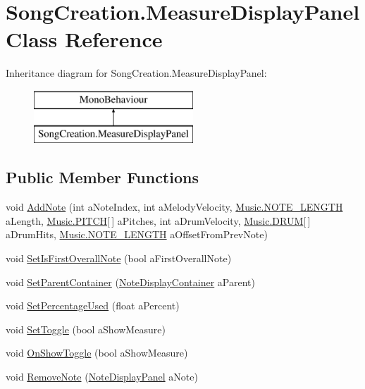 \hypertarget{class_song_creation_1_1_measure_display_panel}{}\section{Song\+Creation.\+Measure\+Display\+Panel Class Reference}
\label{class_song_creation_1_1_measure_display_panel}
Inheritance diagram for Song\+Creation.\+Measure\+Display\+Panel\+:\begin{figure}[H]
\begin{center}
\leavevmode
\includegraphics[height=2.000000cm]{class_song_creation_1_1_measure_display_panel}
\end{center}
\end{figure}
\subsection*{Public Member Functions}
\begin{DoxyCompactItemize}
\item 
void \hyperlink{class_song_creation_1_1_measure_display_panel_a620c513de8f4e5e4dbf769d1ca7b711b}{Add\+Note} (int a\+Note\+Index, int a\+Melody\+Velocity, \hyperlink{group___music_enums_gaf11b5f079adbb21c800b9eca1c5c3cbd}{Music.\+N\+O\+T\+E\+\_\+\+L\+E\+N\+G\+TH} a\+Length, \hyperlink{group___music_enums_ga508f69b199ea518f935486c990edac1d}{Music.\+P\+I\+T\+CH}\mbox{[}$\,$\mbox{]} a\+Pitches, int a\+Drum\+Velocity, \hyperlink{group___music_enums_gade475b4382c7066d1af13e7c13c029b6}{Music.\+D\+R\+UM}\mbox{[}$\,$\mbox{]} a\+Drum\+Hits, \hyperlink{group___music_enums_gaf11b5f079adbb21c800b9eca1c5c3cbd}{Music.\+N\+O\+T\+E\+\_\+\+L\+E\+N\+G\+TH} a\+Offset\+From\+Prev\+Note)
\item 
void \hyperlink{class_song_creation_1_1_measure_display_panel_abe0267cd2c5a74710c0278478dacf52e}{Set\+Is\+First\+Overall\+Note} (bool a\+First\+Overall\+Note)
\item 
void \hyperlink{class_song_creation_1_1_measure_display_panel_a6ac294ddd95114544f6fcc6e3c9ab355}{Set\+Parent\+Container} (\hyperlink{class_song_creation_1_1_note_display_container}{Note\+Display\+Container} a\+Parent)
\item 
void \hyperlink{class_song_creation_1_1_measure_display_panel_a0efb19869f0c34cae1a617fe7c5880d5}{Set\+Percentage\+Used} (float a\+Percent)
\item 
void \hyperlink{class_song_creation_1_1_measure_display_panel_a77bbca4dc7add6b1e33394834e40cdde}{Set\+Toggle} (bool a\+Show\+Measure)
\item 
void \hyperlink{class_song_creation_1_1_measure_display_panel_a0ade5469a803bafc5a87595d0a2fef88}{On\+Show\+Toggle} (bool a\+Show\+Measure)
\item 
void \hyperlink{class_song_creation_1_1_measure_display_panel_a56881a6bd83cad971a42aa9f9955a0ee}{Remove\+Note} (\hyperlink{class_song_creation_1_1_note_display_panel}{Note\+Display\+Panel} a\+Note)
\end{DoxyCompactItemize}
